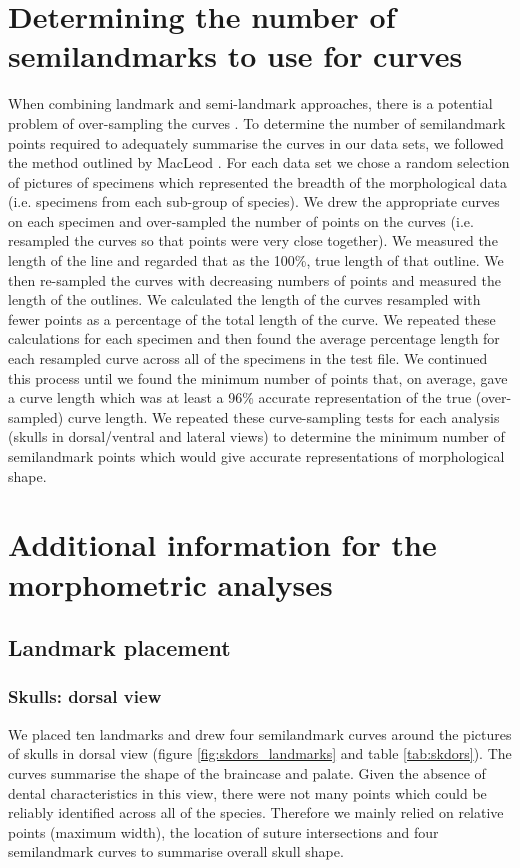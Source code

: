 \documentclass[12pt,a4paper]{article}
\begin{document}
\section{Determining the number of semilandmarks to use for curves}
	When combining landmark and semi-landmark approaches, there is a potential problem of over-sampling the curves \citep{Gunz2013}. To determine the number of semilandmark points required to adequately summarise the curves in our data sets,  we followed the method outlined by MacLeod \citeyearpar{MacLeod2012}. 
	For each data set we chose a random selection of pictures of specimens which represented the breadth of the morphological data (i.e. specimens from each sub-group of species).  We drew the appropriate curves on each specimen and over-sampled the number of points on the curves (i.e. resampled the curves so that points were very close together). 
	We measured the length of the line and regarded that as the 100\%, true length of that outline. We then re-sampled the curves with decreasing numbers of points and measured the length of the outlines. We calculated the length of the curves resampled with fewer points as a percentage of the total length of the curve. We repeated these calculations for each specimen and then found the average percentage length for each resampled curve across all of the specimens in the test file. We continued this process until we found the minimum number of points that, on average, gave a curve length which was at least a 96\% accurate representation of the true (over-sampled) curve length.  
	We repeated these curve-sampling tests for each analysis (skulls in dorsal/ventral and lateral views) to determine the minimum number of semilandmark points which would give accurate representations of morphological shape.

\section{Additional information for the morphometric analyses}

\subsection{Landmark placement}

\subsubsection{Skulls: dorsal view}
	We placed ten landmarks and drew four semilandmark curves around the pictures of skulls in dorsal view (figure \ref{fig:skdors_landmarks} and table \ref{tab:skdors}). The curves summarise the shape of the braincase and palate.
	Given the absence of dental characteristics in this view, there were not many points which could be reliably identified across all of the species. Therefore we mainly relied on relative points (maximum width), the location of suture intersections and four semilandmark curves to summarise overall skull shape.  
\end{document}
